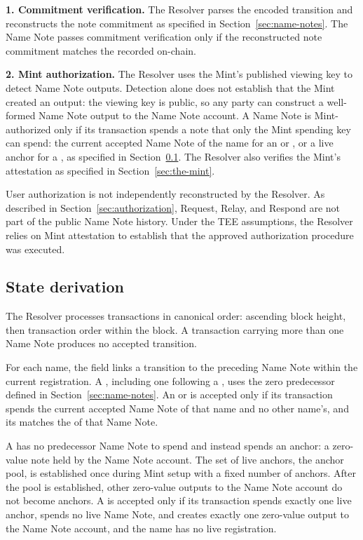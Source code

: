 \textbf{1. Commitment verification.} The Resolver parses the encoded transition and reconstructs the note commitment as specified in Section~\ref{sec:name-notes}. The Name Note passes commitment verification only if the reconstructed note commitment matches the  recorded on-chain.

\textbf{2. Mint authorization.} The Resolver uses the Mint's published viewing key to detect Name Note outputs. Detection alone does not establish that the Mint created an output: the viewing key is public, so any party can construct a well-formed Name Note output to the Name Note account. A Name Note is Mint-authorized only if its transaction spends a note that only the Mint spending key can spend: the current accepted Name Note of the name for an  or , or a live anchor for a , as specified in Section~\ref{sec:resolver-state}. The Resolver also verifies the Mint's attestation as specified in Section~\ref{sec:the-mint}.

User authorization is not independently reconstructed by the Resolver. As described in Section~\ref{sec:authorization}, Request, Relay, and Respond are not part of the public Name Note history. Under the TEE assumptions, the Resolver relies on Mint attestation to establish that the approved authorization procedure was executed.

\subsection{State derivation}
\label{sec:resolver-state}

The Resolver processes transactions in canonical order: ascending block height, then transaction order within the block. A transaction carrying more than one Name Note produces no accepted transition.

For each name, the  field links a transition to the preceding Name Note within the current registration. A , including one following a , uses the zero predecessor defined in Section~\ref{sec:name-notes}. An  or  is accepted only if its transaction spends the current accepted Name Note of that name and no other name's, and its  matches the  of that Name Note.

A  has no predecessor Name Note to spend and instead spends an anchor: a zero-value note held by the Name Note account. The set of live anchors, the anchor pool, is established once during Mint setup with a fixed number of anchors. After the pool is established, other zero-value outputs to the Name Note account do not become anchors. A  is accepted only if its transaction spends exactly one live anchor, spends no live Name Note, and creates exactly one zero-value output to the Name Note account, and the name has no live registration.

